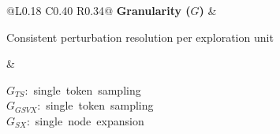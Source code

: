 \documentclass[3p,times,10pt,nopreprintline]{elsarticle}
\newcommand{\nowrap}[1]{\mbox{#1}}
\begin{document}
\begin{table}[H]
\begin{tabular}{@{}L{0.18\textwidth} C{0.40\textwidth} R{0.34\textwidth}@{}}
\textbf{Granularity ($G$)} &
\begin{minipage}[c]{0.40\textwidth}\centering
Consistent perturbation resolution per exploration unit
\end{minipage} &
\begin{minipage}[c]{0.34\textwidth}\centering
\nowrap{$G_{TS}$: single token sampling}\\
\nowrap{$G_{GSVX}$: single token sampling}\\
\nowrap{$G_{SX}$: single node expansion}
\end{minipage}\\[0.6em]
\bottomrule
\end{tabular}

\caption{Common budget, sparsity and receptive field across explainers (TS: TokenSHAP; GSVX: GraphSVX; SX: SubgraphX). Every configuration shares the same evaluation depth and perturbation resolution, so that differences between explanations can be attributed to the explainer or to the representation.}
\label{tab:fairness}
\end{table}
\end{document}
